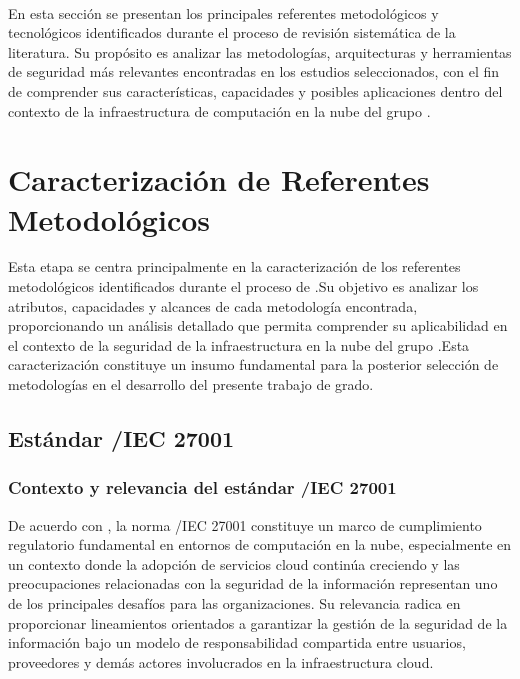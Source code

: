 \label{cap:caracterizacion}
\mbox{}\\

En esta sección se presentan los principales referentes metodológicos y tecnológicos identificados durante el proceso de revisión 
sistemática de la literatura. Su propósito es analizar las metodologías, arquitecturas y herramientas de seguridad más relevantes 
encontradas en los estudios seleccionados, con el fin de comprender sus características, capacidades y posibles aplicaciones dentro del 
contexto de la infraestructura de computación en la nube del grupo \GRID.\@

\section{Caracterización de Referentes Metodológicos}

Esta etapa se centra principalmente en la caracterización de los referentes metodológicos identificados durante el proceso de \SMS.\@ Su 
objetivo es analizar los atributos, capacidades y alcances de cada metodología encontrada, proporcionando un análisis detallado que 
permita comprender su aplicabilidad en el contexto de la seguridad de la infraestructura en la nube del grupo \GRID.\@ Esta caracterización 
constituye un insumo fundamental para la posterior selección de metodologías en el desarrollo del presente trabajo de grado.

\subsection{Estándar \ISO/IEC 27001}

\subsubsection{Contexto y relevancia del estándar \ISO/IEC 27001}

De acuerdo con \citeauthor{rajesh2024unified}, la norma \ISO/IEC 27001 constituye un marco de cumplimiento regulatorio fundamental en 
entornos de computación en la nube, especialmente en un contexto donde la adopción de servicios cloud continúa creciendo y las 
preocupaciones relacionadas con la seguridad de la información representan uno de los principales desafíos para las organizaciones. 
Su relevancia radica en proporcionar lineamientos orientados a garantizar la gestión de la seguridad de la información bajo un modelo de 
responsabilidad compartida entre usuarios, proveedores y demás actores involucrados en la infraestructura cloud.

